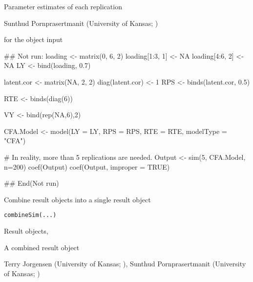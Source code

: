 \documentclass[a4paper]{book}
\begin{document}
%
\begin{Value}
Parameter estimates of each replication
\end{Value}
%
\begin{Author}\relax
Sunthud Pornprasertmanit (University of Kansas; )
\end{Author}
%
\begin{SeeAlso}\relax
{} for the object input
\end{SeeAlso}
%
\begin{Examples}
\begin{ExampleCode}
## Not run: 
loading <- matrix(0, 6, 2)
loading[1:3, 1] <- NA
loading[4:6, 2] <- NA
LY <- bind(loading, 0.7)

latent.cor <- matrix(NA, 2, 2)
diag(latent.cor) <- 1
RPS <- binds(latent.cor, 0.5)

RTE <- binds(diag(6))

VY <- bind(rep(NA,6),2)

CFA.Model <- model(LY = LY, RPS = RPS, RTE = RTE, modelType = "CFA")

# In reality, more than 5 replications are needed.
Output <- sim(5, CFA.Model, n=200)
coef(Output)
coef(Output, improper = TRUE)

## End(Not run)
\end{ExampleCode}
\end{Examples}
%
\begin{Description}\relax
Combine result objects into a single result object
\end{Description}
%
\begin{Usage}
\begin{verbatim}
combineSim(...)
\end{verbatim}
\end{Usage}
%
\begin{Arguments}
\begin{ldescription}
\item[\code{...}] Result objects, 
\end{ldescription}
\end{Arguments}
%
\begin{Value}
	A combined result object
\end{Value}
%
\begin{Author}\relax
Terry Jorgensen (University of Kansas; ), 
Sunthud Pornprasertmanit (University of Kansas; )
\end{Author}
\end{document}
